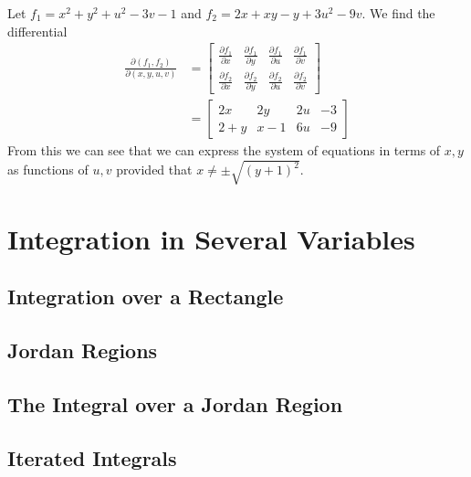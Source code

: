 \documentclass[12pt]{book}
\newenvironment{exercise}[2][Exercise]{\begin{trivlist}
\item[\hskip \labelsep {\bfseries #1}\hskip \labelsep {\bfseries #2.}]}{\end{trivlist}}
\begin{document}
\begin{exercise}{7.2.7}
\begin{exercise}{9.7.8}
    Let $f_1 = x^2+y^2+u^2-3v-1$ and $f_2= 2x + xy - y + 3u^2 - 9v$. We find the differential
    \begin{align*}
    \frac{\partial (f_1,f_2)}{\partial(x,y,u,v)} &= \begin{bmatrix} \frac{\partial f_1}{\partial x} & \frac{\partial f_1}{\partial y} & \frac{\partial f_1}{\partial u} & \frac{\partial f_1}{\partial v} \\ \frac{\partial f_2}{\partial x} & \frac{\partial f_2}{\partial y} & \frac{\partial f_2}{\partial u} & \frac{\partial f_2}{\partial v}  \end{bmatrix} \\
                                                 &= \begin{bmatrix} 2x & 2y & 2u & -3 \\ 2+y & x-1 & 6u & -9 \end{bmatrix}
    \end{align*}
    From this we can see that we can express the system of equations in terms of $x,y$ as functions of $u,v$ provided that $x \neq \pm \sqrt{ (y+1)^2}$.

\end{exercise}






\chapter{Integration in Several Variables}
\section{Integration over a Rectangle}


\section{Jordan Regions}

\section{The Integral over a Jordan Region}


\section{Iterated Integrals}


\end{exercise}
\end{document}
